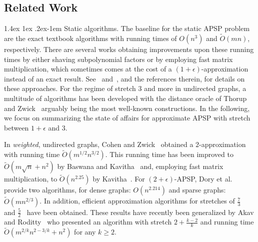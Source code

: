 \documentclass[11pt]{article}
\makeatletter
\theoremstyle{definition}
\theoremstyle{remark}
\renewcommand{\paragraph}{%
  \@startsection{paragraph}{4}%
  {\z@}{1.4ex \@plus 1ex \@minus .2ex}{-1em}%
  {\normalfont\normalsize\bfseries}%
}
\makeatother
\begin{document}


\subsection{Related Work}

\paragraph{Static algorithms.}
The baseline for the static APSP problem are the exact textbook algorithms with running times of $ O (n^3) $ and $ \tilde O (m n) $, respectively.
There are several works obtaining improvements upon these running times by either shaving subpolynomial factors or by employing fast matrix multiplication, which sometimes comes at the cost of a $ (1 + \epsilon) $-approximation instead of an exact result.
See~\cite{Zwick01} and~\cite{Williams18}, and the references therein, for details on these approaches.
For the regime of stretch $ 3 $ and more in undirected graphs, a multitude of algorithms has been developed with the distance oracle of Thorup and Zwick~\cite{TZ2005} arguably being the most well-known constructions.
In the following, we focus on summarizing the state of affairs for approximate APSP with stretch between $ 1 + \epsilon $ and $ 3 $.

In \emph{weighted}, undirected graphs, Cohen and Zwick~\cite{CohenZ01} obtained a $2$-approximation with running time $ \tilde O (m^{1/2} n^{3/2}) $.
This running time has been improved to $ \tilde O (m \sqrt{n} + n^2) $ by Baswana and Kavitha~\cite{BaswanaK10} and, employing fast matrix multiplication, to $ \tilde O (n^{2.25}) $ by Kavitha~\cite{Kavitha12}.
For $(2+\epsilon)$-APSP, Dory et al.~\cite{DoryFKNVV23} provide two algorithms, for dense graphs: $ O(n^{2.214})$ and sparse graphs: $\tilde O(mn^{2/3})$.
In addition, efficient approximation algorithms for stretches of $ \tfrac{7}{3} $~\cite{CohenZ01} and $ \tfrac{5}{2} $~\cite{Kavitha12} have been obtained.
These results have recently been generalized by Akav and Roditty~\cite{AkavR21} who presented an algorithm with stretch $ 2 + \tfrac{k-2}{k} $ and running time $ \tilde O (m^{2/k} n^{2 - 3/k} + n^2) $ for any $ k \geq 2 $.
\end{document}
